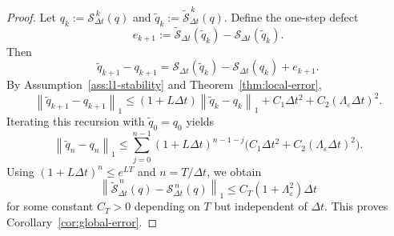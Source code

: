 \documentclass[10pt,a4paper]{amsart}
\begin{document}
\begin{proof}
Let $q_k := \mathcal{S}_{\Delta t}^{\,k}(q)$ and $\tilde q_k := \widetilde{\mathcal{S}}_{\Delta t}^{\,k}(q)$. Define the one-step defect
\[
e_{k+1}
:=
\widetilde{\mathcal{S}}_{\Delta t}(\tilde q_k)
-
\mathcal{S}_{\Delta t}(\tilde q_k).
\]
Then
\[
\tilde q_{k+1}-q_{k+1}
=
\mathcal{S}_{\Delta t}(\tilde q_k)-\mathcal{S}_{\Delta t}(q_k)+e_{k+1}.
\]
By Assumption~\ref{ass:l1-stability} and Theorem~\ref{thm:local-error},
\[
\left\lVert \tilde q_{k+1}-q_{k+1} \right\rVert_1
\le
(1+L\Delta t)\left\lVert \tilde q_k-q_k \right\rVert_1
+
C_1\Delta t^2
+
C_2(\Lambda_{\varepsilon}\Delta t)^2.
\]
Iterating this recursion with $\tilde q_0=q_0$ yields
\[
\left\lVert \tilde q_n-q_n \right\rVert_1
\le
\sum_{j=0}^{n-1}
(1+L\Delta t)^{n-1-j}
\bigl(
C_1\Delta t^2 + C_2(\Lambda_{\varepsilon}\Delta t)^2
\bigr).
\]
Using $(1+L\Delta t)^n \le e^{LT}$ and $n=T/\Delta t$, we obtain
\[
\left\lVert
\widetilde{\mathcal{S}}_{\Delta t}^{\,n}(q)
-
\mathcal{S}_{\Delta t}^{\,n}(q)
\right\rVert_1
\le
C_T(1+\Lambda_{\varepsilon}^2)\Delta t
\]
for some constant $C_T>0$ depending on $T$ but independent of $\Delta t$. This proves Corollary~\ref{cor:global-error}.
\end{proof}
\end{document}
